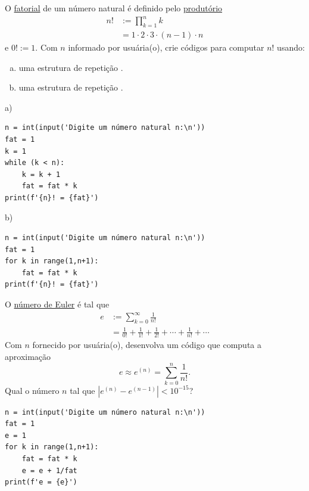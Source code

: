 \begin{exer}
  O \href{https://pt.wikipedia.org/wiki/Fatorial}{fatorial} de um número natural é definido pelo \href{https://pt.wikipedia.org/wiki/Produt\%C3\%B3rio}{produtório}
  \begin{align}
    n! &:= \prod_{k=1}^{n}k\\
       &= 1\cdot 2\cdot 3 \cdot (n-1)\cdot n
  \end{align}
  e $0! := 1$. Com $n$ informado por usuária(o), crie códigos para computar $n!$ usando:
  \begin{enumerate}[a)]
  \item uma estrutura de repetição {\PYTHONwhile}.
  \item uma estrutura de repetição {\PYTHONfor}.
  \end{enumerate}
\end{exer}
\begin{resp}
  a)

\begin{lstlisting}
n = int(input('Digite um número natural n:\n'))
fat = 1
k = 1
while (k < n):
    k = k + 1
    fat = fat * k
print(f'{n}! = {fat}')
\end{lstlisting}

b)

\begin{lstlisting}
n = int(input('Digite um número natural n:\n'))
fat = 1
for k in range(1,n+1):
    fat = fat * k
print(f'{n}! = {fat}')
\end{lstlisting}

\end{resp}

\begin{exer}
  O \href{https://pt.wikipedia.org/wiki/E_(constante_matem\%C3\%A1tica)}{número de Euler}{\euler} é tal que
  \begin{align}
    e &:= \sum_{k=0}^\infty \frac{1}{n!}\\
      &= \frac{1}{0!} + \frac{1}{1!} + \frac{1}{2!} + \cdots + \frac{1}{n!} + \cdots
  \end{align}
  Com $n$ fornecido por usuária(o), desenvolva um código que computa a aproximação
  \begin{equation}
    e \approx e^{(n)} = \sum_{k=0}^n \frac{1}{n!}.
  \end{equation}
  Qual o número $n$ tal que $\left|e^{(n)} - e^{(n-1)}\right|<10^{-15}$?
\end{exer}
\begin{resp}

\begin{lstlisting}
n = int(input('Digite um número natural n:\n'))
fat = 1
e = 1
for k in range(1,n+1):
    fat = fat * k
    e = e + 1/fat
print(f'e = {e}')
\end{lstlisting}

\end{resp}

